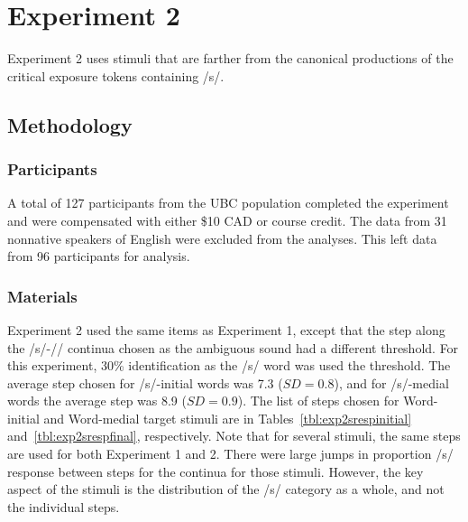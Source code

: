 \section{Experiment 2}

Experiment 2 uses stimuli that are farther from the canonical productions of the critical exposure tokens containing /s/.

\subsection{Methodology}

\subsubsection{Participants}

A total of 127 participants from the UBC population completed the experiment and were compensated with either \$10 CAD or course credit.  
The data from 31 nonnative speakers of English were excluded from the analyses.
This left data from 96 participants for analysis.

\subsubsection{Materials}

Experiment 2 used the same items as Experiment 1, except that the step along the /s/-/\textesh/ continua chosen as the ambiguous sound had a different threshold.  
For this experiment, 30\% identification as the /s/ word was used the threshold. The average step chosen for /s/-initial words was 7.3 ($SD = 0.8$), and for /s/-medial words the average step was 8.9 ($SD = 0.9$).  
The list of steps chosen for Word-initial and Word-medial target stimuli are in Tables~\ref{tbl:exp2srespinitial} and~\ref{tbl:exp2srespfinal}, respectively.  
Note that for several stimuli, the same steps are used for both Experiment 1 and 2.
There were large jumps in proportion /s/ response between steps for the continua for those stimuli.
However, the key aspect of the stimuli is the distribution of the /s/ category as a whole, and not the individual steps.

